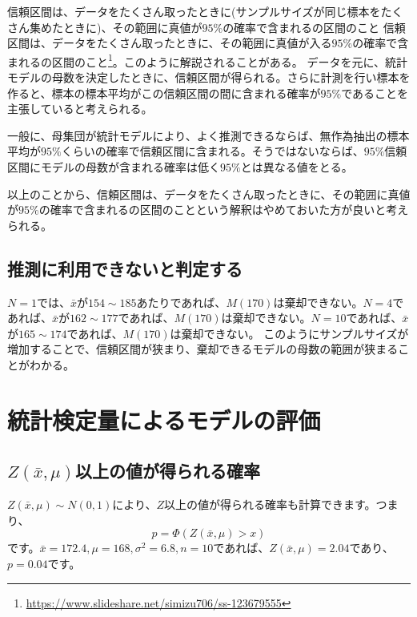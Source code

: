 \begin{SMbox}{信頼区間は、データをたくさん取ったときに(サンプルサイズが同じ標本をたくさん集めたときに)、その範囲に真値が$95\%$の確率で含まれるの区間のこと}
信頼区間は、データをたくさん取ったときに、その範囲に真値が入る$95\%$の確率で含まれるの区間のこと\footnote{\url{https://www.slideshare.net/simizu706/ss-123679555}}。このように解説されることがある。
データを元に、統計モデルの母数を決定したときに、信頼区間が得られる。さらに計測を行い標本を作ると、標本の標本平均がこの信頼区間の間に含まれる確率が$95\%$であることを主張していると考えられる。

一般に、母集団が統計モデルにより、よく推測できるならば、無作為抽出の標本平均が$95\%$くらいの確率で信頼区間に含まれる。そうではないならば、$95\%$信頼区間にモデルの母数が含まれる確率は低く$95\%$とは異なる値をとる。

以上のことから、信頼区間は、データをたくさん取ったときに、その範囲に真値が$95\%$の確率で含まれるの区間のことという解釈はやめておいた方が良いと考えられる。
\end{SMbox}



\subsection{推測に利用できないと判定する}

$N=1$では、$\bar{x}$が$154\sim185$あたりであれば、$M(170)$は棄却できない。$N=4$であれば、$\bar{x}$が$162\sim177$であれば、$M(170)$は棄却できない。$N=10$であれば、$\bar{x}$が$165\sim174$であれば、$M(170)$は棄却できない。
このようにサンプルサイズが増加することで、信頼区間が狭まり、棄却できるモデルの母数の範囲が狭まることがわかる。
\fi

\section{統計検定量によるモデルの評価}

\subsection{$Z(\bar{x},\mu)$以上の値が得られる確率}
$Z(\bar{x},\mu)\sim N(0,1)$により、$Z$以上の値が得られる確率も計算できます。つまり、
\begin{equation*}
    p = \varPhi(Z(\bar{x},\mu)>x)
\end{equation*}
です。$\bar{x}=172.4,\mu=168,\sigma^2=6.8,n=10$であれば、$Z(\bar{x},\mu)=2.04$であり、
$p=0.04$です。

